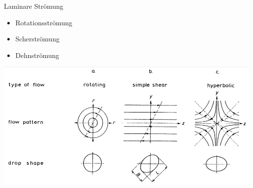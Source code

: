 \documentclass{beamer} %
\begin{document}
\begin{frame}{Laminare Strömung}
	\begin{itemize}
		\item Rotationsströmung
		\item Scherströmung
		\item Dehnströmung
	\end{itemize}
	\includegraphics[width=\linewidth]{Markus/Laminarflow}
\end{frame}
\end{document}

